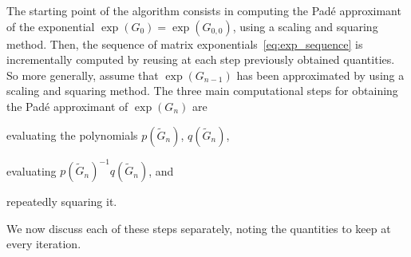 The starting point of the algorithm consists in computing the Pad\'e approximant of the exponential $\exp(G_0)= \exp(G_{0,0})$, using a scaling and squaring method. Then, the sequence of matrix exponentials~\eqref{eq:exp_sequence} is incrementally computed by reusing at each step previously obtained quantities. So more generally, assume that $\exp(G_{n-1})$ has been approximated by using a scaling and squaring
method.  The three main computational steps for obtaining the Pad\'e approximant of $\exp(G_n)$ are
\begin{inparaenum}[(i)]
\item evaluating the polynomials $p(\tilde{G}_n)$, $q(\tilde{G}_n)$,
\item evaluating $p(\tilde{G}_n)^{-1} q(\tilde{G}_n)$, and
\item repeatedly squaring it.
\end{inparaenum}
We now discuss each of these steps separately, noting the quantities to keep at every iteration.

